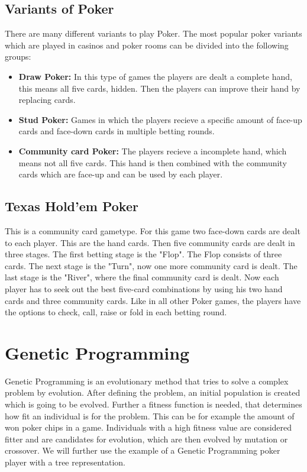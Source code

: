 \documentclass[12pt,fleqn,a4paper]{article}
\begin{document}
\subsection{Variants of Poker}
There are many different variants to play Poker. The most popular poker variants which are played in casinos and poker rooms can be divided into the following groups:
\begin{itemize}
	\item \textbf{Draw Poker:} In this type of games the players are dealt a complete hand, this means all five cards, hidden. Then the players can improve their hand by replacing cards.
	\item \textbf{Stud Poker:} Games in which the players recieve a specific amount of face-up cards and face-down cards in multiple betting rounds.
	\item \textbf{Community card Poker:} The players recieve a incomplete hand, which means not all five cards. This hand is then combined with the community cards which are face-up and can be used by each player.
\end{itemize}

\subsection{Texas Hold'em Poker}
This is a community card gametype. For this game two face-down cards are dealt to each player. This are the hand cards.
Then five community cards are dealt in three stages. The first betting stage is the "Flop". The Flop consists of three cards. The next stage is the "Turn", now one more community card is dealt. The last stage is the "River", where the final community card is dealt. Now each player has to seek out the best five-card combinations by using his two hand cards and three community cards. Like in all other Poker games, the players have the options to check, call, raise or fold in each betting round.

\newpage


\section{Genetic Programming}
\label{sec:genprog}
Genetic Programming is an evolutionary method that tries to solve a complex problem by evolution.
After defining the problem, an initial population is created which is going to be evolved.
Further a fitness function is needed, that determines how fit an individual is for the problem.
This can be for example the amount of won poker chips in a game.
Individuals with a high fitness value are considered fitter and are candidates for evolution, which are then evolved by mutation or crossover.
We will further use the example of a Genetic Programming poker player with a tree representation.
\end{document}
